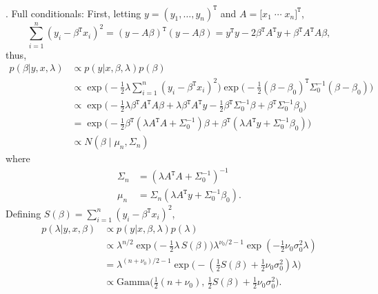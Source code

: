 \documentclass[11pt]{article}
\newcommand{\T}{\mathtt{T}}
\begin{document}
. Full conditionals: First, letting $y = (y_1,\ldots,y_n)^\T$ and $A = \Big[x_1 \;\cdots\; x_n\Big]^\T$,
$$ \sum_{i = 1}^n (y_i -\beta^\T x_i)^2 = (y - A \beta)^\T (y - A \beta) = y^\T y - 2 \beta^\T A^\T y + \beta^\T A^\T A \beta, $$
thus,
\begin{align*}
p(\beta|y,x,\lambda)&\propto p(y|x,\beta,\lambda) p(\beta)\\
&\propto\exp\big(-\tfrac{1}{2}\lambda{\textstyle\sum_{i = 1}^n} (y_i -\beta^\T x_i)^2\big)\exp\big(-\tfrac{1}{2}(\beta -\beta_0)^\T \Sigma_0^{-1}(\beta -\beta_0)\big)\\
&\propto\exp\big(-\tfrac{1}{2}\lambda\beta^\T A^\T A \beta + \lambda\beta^\T A^\T y - \tfrac{1}{2}\beta^\T \Sigma_0^{-1}\beta +\beta^\T\Sigma_0^{-1}\beta_0\big)\\
&=\exp\big(-\tfrac{1}{2}\beta^\T (\lambda A^\T A +\Sigma_0^{-1}) \beta + \beta^\T(\lambda A^\T y + \Sigma_0^{-1}\beta_0)\big)\\
&\propto N(\beta\mid\mu_n,\Sigma_n)
\end{align*}
where
\begin{align*}
\Sigma_n &= (\lambda A^\T A +\Sigma_0^{-1})^{-1}\\
\mu_n &= \Sigma_n (\lambda A^\T y +\Sigma_0^{-1}\beta_0).
\end{align*}
Defining $S(\beta) = \sum_{i = 1}^n (y_i -\beta^\T x_i)^2$, 
\begin{align*}
p(\lambda|y,x,\beta) &\propto p(y|x,\beta,\lambda) p(\lambda)\\
&\propto \lambda^{n/2}\exp\big(-\tfrac{1}{2}\lambda \,S(\beta)\big) \lambda^{\nu_0/2-1}\exp(-\tfrac{1}{2}\nu_0\sigma_0^2\lambda)\\
& =\lambda^{(n + \nu_0)/2-1}\exp\big( - (\tfrac{1}{2}S(\beta) + \tfrac{1}{2}\nu_0\sigma_0^2)\lambda\big)\\
&\propto \mathrm{Gamma}\big(\tfrac{1}{2}(n + \nu_0),\, \tfrac{1}{2}S(\beta) + \tfrac{1}{2}\nu_0\sigma_0^2\big).
\end{align*}
\end{document}
